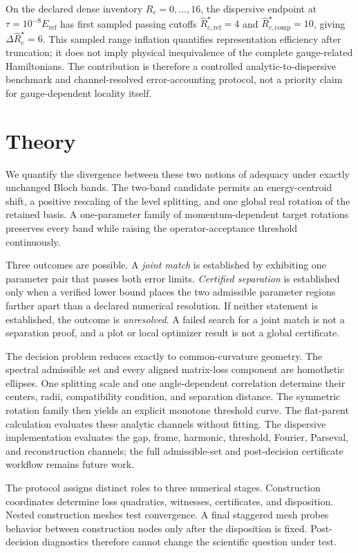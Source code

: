 \documentclass[aps,prb,reprint,amsmath,amssymb,longbibliography,floatfix]{revtex4-2}
\begin{document}
On the declared dense inventory $R_c=0,\ldots,16$, the dispersive endpoint at
$\tau=10^{-8}E_{\mathrm{ref}}$ has first sampled passing cutoffs
$\widehat R_{c,\mathrm{ref}}^\star=4$ and
$\widehat R_{c,\mathrm{comp}}^\star=10$, giving
$\Delta\widehat R_c^\star=6$. This sampled range inflation quantifies representation
efficiency after truncation; it does not imply physical inequivalence of the complete
gauge-related Hamiltonians. The contribution is therefore a controlled
analytic-to-dispersive benchmark and channel-resolved error-accounting protocol, not a
priority claim for gauge-dependent locality itself.

\section{Theory}

We quantify the divergence between these two notions of adequacy under exactly unchanged
Bloch bands. The two-band candidate permits an energy-centroid shift, a positive
rescaling of the level splitting, and one global real rotation of the retained basis. A
one-parameter family of momentum-dependent target rotations preserves every band while
raising the operator-acceptance threshold continuously.

Three outcomes are possible. A \emph{joint match} is established by exhibiting one
parameter pair that passes both error limits. \emph{Certified separation} is established
only when a verified lower bound places the two admissible parameter regions farther
apart than a declared numerical resolution. If neither statement is established, the
outcome is \emph{unresolved}. A failed search for a joint match is not a separation
proof, and a plot or local optimizer result is not a global certificate.

The decision problem reduces exactly to common-curvature geometry. The spectral
admissible set and every aligned matrix-loss component are homothetic ellipses. One
splitting scale and one angle-dependent correlation determine their centers, radii,
compatibility condition, and separation distance. The symmetric rotation family then
yields an explicit monotone threshold curve. The flat-parent calculation evaluates
these analytic channels without fitting. The dispersive implementation evaluates the
gap, frame, harmonic, threshold, Fourier, Parseval, and reconstruction channels; the
full admissible-set and post-decision certificate workflow remains future work.

The protocol assigns distinct roles to three numerical stages. Construction coordinates
determine loss quadratics, witnesses, certificates, and disposition. Nested construction
meshes test convergence. A final staggered mesh probes behavior between construction
nodes only after the disposition is fixed. Post-decision diagnostics therefore cannot
change the scientific question under test.
\end{document}
